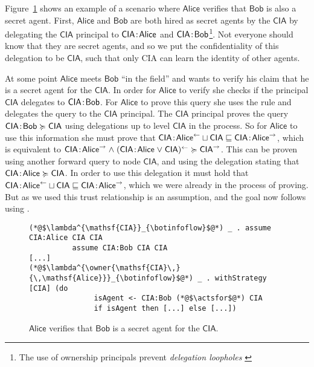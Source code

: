 Figure~\ref{fig:govt-alice-checks-bob} shows an example of a scenario where $\mathsf{Alice}$ verifies that $\mathsf{Bob}$ is also a secret agent. First, $\mathsf{Alice}$ and $\mathsf{Bob}$ are both hired as secret agents by the $\mathsf{CIA}$ by delegating the $\mathsf{CIA}$ principal to $\mathsf{CIA}\!:\!\mathsf{Alice}$ and $\mathsf{CIA}\!:\!\mathsf{Bob}$\footnote{The use of ownership principals prevent \emph{delegation loopholes} \cite{Arden:2015:FA:2859845.2859998}}. Not everyone should know that they are secret agents, and so we put the confidentiality of this delegation to be $\mathsf{CIA}$, such that only CIA can learn the identity of other agents.

At some point $\mathsf{Alice}$ meets $\mathsf{Bob}$ ``in the field'' and wants to verify his claim that he is a secret agent for the $\mathsf{CIA}$. In order for $\mathsf{Alice}$ to verify she checks if the principal $\mathsf{CIA}$ delegates to $\mathsf{CIA}\!:\!\mathsf{Bob}$. For $\mathsf{Alice}$ to prove this query she uses the  rule and delegates the query to the $\mathsf{CIA}$ principal. The $\mathsf{CIA}$ principal proves the query $\mathsf{CIA}\!:\!\mathsf{Bob} \succcurlyeq \mathsf{CIA}$ using delegations up to level $\mathsf{CIA}$ in the process. So for $\mathsf{Alice}$ to use this information she must prove that $\mathsf{CIA}\!:\!\mathsf{Alice}^{\leftarrow} \sqcup \mathsf{CIA} \sqsubseteq \mathsf{CIA}\!:\!\mathsf{Alice}^{\rightarrow}$, which is equivalent to $\mathsf{CIA}\!:\!\mathsf{Alice}^{\rightarrow} \mathrel{\land} (\mathsf{CIA}\!:\!\mathsf{Alice} \mathrel{\lor} \mathsf{CIA})^{\leftarrow} \succcurlyeq \mathsf{CIA}^{\rightarrow}$. This can be proven using another forward query to node $\mathsf{CIA}$, and using the delegation stating that $\mathsf{CIA}\!:\!\mathsf{Alice} \succcurlyeq \mathsf{CIA}$. In order to use this delegation it must hold that $\mathsf{CIA}\!:\!\mathsf{Alice}^{\leftarrow} \sqcup \mathsf{CIA} \sqsubseteq \mathsf{CIA}\!:\!\mathsf{Alice}^{\rightarrow}$, which we were already in the process of proving. But as we used  this trust relationship is an assumption, and the goal now follows using .

\begin{figure}
\centering
\begin{lstlisting}
(*@$\lambda^{\mathsf{CIA}}_{\botinfoflow}$@*) _ . assume CIA:Alice CIA CIA
          assume CIA:Bob CIA CIA
[...]
(*@$\lambda^{\owner{\mathsf{CIA}\,}{\,\mathsf{Alice}}}_{\botinfoflow}$@*) _ . withStrategy [CIA] (do
               isAgent <- CIA:Bob (*@$\actsfor$@*) CIA
               if isAgent then [...] else [...])
\end{lstlisting}
\caption{$\mathsf{Alice}$ verifies that $\mathsf{Bob}$ is a secret agent for the $\mathsf{CIA}$.}
\label{fig:govt-alice-checks-bob}
\end{figure}